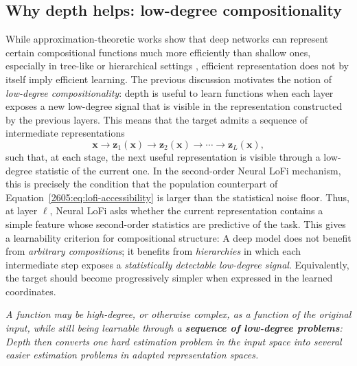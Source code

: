 \subsection{Why depth helps: low-degree compositionality}
\label{2605:sec:low-degree-compositionality}
While approximation-theoretic works show that deep networks can represent certain compositional functions much more efficiently than shallow ones, especially in tree-like or hierarchical settings
\cite{mhaskar2017when,telgarsky2016benefits}, efficient representation does not by itself imply efficient learning. The previous discussion motivates the notion of \emph{low-degree compositionality}: depth is useful to learn functions when each layer exposes a new low-degree signal that is visible in the representation constructed by the previous layers. This means that the target admits a sequence of intermediate representations
\[
\bm x
 \longrightarrow 
\bm z_1(\bm x)
 \longrightarrow 
\bm z_2(\bm x)
 \longrightarrow 
\cdots
 \longrightarrow 
\bm z_L(\bm x),
\]
such that, at each stage, the next useful representation is visible through a low-degree statistic of the current one. In the second-order Neural LoFi mechanism, this is precisely the condition that the population counterpart of Equation~\eqref{2605:eq:lofi-accessibility} is larger than the statistical noise floor. Thus, at layer $\ell$, Neural LoFi asks whether the current representation contains a simple feature whose second-order statistics are predictive of the task. This gives a learnability criterion for compositional structure: A deep model does not benefit from {\it arbitrary compositions}; it benefits from {\it hierarchies} in which each intermediate step exposes a {\it statistically detectable low-degree signal}. 
Equivalently, the target should become progressively simpler when expressed in the learned coordinates. 

\emph{A function may be high-degree, or otherwise complex, as a function of the original input, while still being learnable through a {\bf sequence of low-degree problems}: Depth then converts one hard estimation problem in the input space into several easier estimation problems in adapted representation spaces.} 

